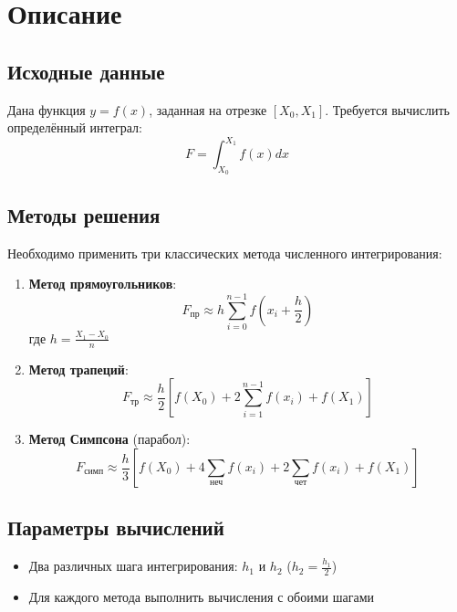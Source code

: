 
\section*{Описание}

\subsection*{Исходные данные}
Дана функция $y = f(x)$, заданная на отрезке $[X_0, X_1]$. Требуется вычислить определённый интеграл:
\[ F = \int_{X_0}^{X_1} f(x) dx \]

\subsection*{Методы решения}
Необходимо применить три классических метода численного интегрирования:

\begin{enumerate}
\item \textbf{Метод прямоугольников}:
\[ F_{\text{пр}} \approx h \sum_{i=0}^{n-1} f\left(x_i + \frac{h}{2}\right) \]
где $h = \frac{X_1 - X_0}{n}$

\item \textbf{Метод трапеций}:
\[ F_{\text{тр}} \approx \frac{h}{2} \left[f(X_0) + 2\sum_{i=1}^{n-1} f(x_i) + f(X_1)\right] \]

\item \textbf{Метод Симпсона} (парабол):
\[ F_{\text{симп}} \approx \frac{h}{3} \left[f(X_0) + 4\sum_{\text{неч}} f(x_i) + 2\sum_{\text{чет}} f(x_i) + f(X_1)\right] \]
\end{enumerate}

\subsection*{Параметры вычислений}
\begin{itemize}
\item Два различных шага интегрирования: $h_1$ и $h_2$ ($h_2 = \frac{h_1}{2}$)
\item Для каждого метода выполнить вычисления с обоими шагами
\end{itemize}

